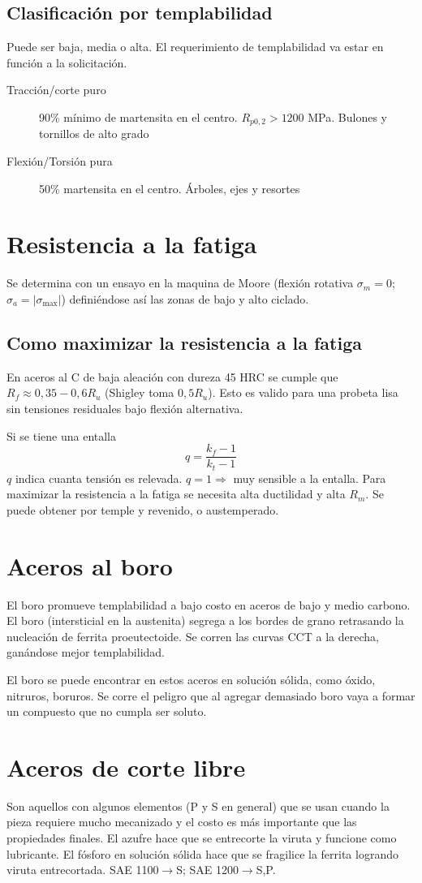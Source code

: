 \subsection*{Clasificación por templabilidad}
Puede ser baja, media o alta. El requerimiento de templabilidad va estar en función a la solicitación.

\begin{description}
	\item[Tracción/corte puro] 90\% mínimo de martensita en el centro. $R_{p0,2}>1200$ MPa. Bulones y tornillos de alto grado
	\item[Flexión/Torsión pura] 50\% martensita en el centro. Árboles, ejes y resortes
\end{description}

\section{Resistencia a la fatiga}
Se determina con un ensayo en la maquina de Moore (flexión rotativa $\sigma_m=0$;$\sigma_a = |\sigma_{\max}|$) definiéndose así las zonas de bajo y alto ciclado.

\subsection*{Como maximizar la resistencia a la fatiga}
En aceros al C de baja aleación con dureza 45 HRC se cumple que $R_f \approx 0,35 - 0,6R_u$ (Shigley toma $0,5R_u$). Esto es valido para una probeta lisa sin tensiones residuales bajo flexión alternativa.

Si se tiene una entalla
\[
q = \frac{k_f -1}{k_t - 1}
\]
$q$ indica cuanta tensión es relevada. $q=1 \Rightarrow$ muy sensible a la entalla.  Para maximizar la resistencia a la fatiga se necesita alta ductilidad y alta $R_m$. Se puede obtener por temple y revenido, o austemperado.

\section{Aceros al boro}
El boro promueve templabilidad a bajo costo en aceros de bajo y medio carbono. El boro (intersticial en la austenita) segrega a los bordes de grano retrasando la nucleación de ferrita proeutectoide. Se corren las curvas CCT a la derecha, ganándose mejor templabilidad.

El boro se puede encontrar en estos aceros en solución sólida, como óxido, nitruros, boruros. Se corre el peligro que al agregar demasiado boro vaya a formar un compuesto que no cumpla ser soluto.

\section{Aceros de corte libre}

Son aquellos con algunos elementos (P y S en general) que se usan cuando la pieza requiere mucho mecanizado y el costo es más importante que las propiedades finales. El azufre hace que se entrecorte la viruta y funcione como lubricante.  El fósforo en solución sólida hace que se fragilice la ferrita logrando viruta entrecortada. SAE 1100$\rightarrow$S; SAE 1200$\rightarrow$S,P.
